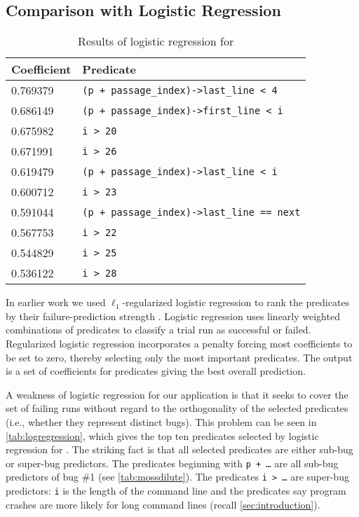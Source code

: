 \subsection{Comparison with Logistic Regression}
\label{sec:comparison}

\begin{table}
\nocaptionrule
\caption{Results of logistic regression for \moss}
\label{tab:logregression}
\centering
\small
\begin{tabular}{ll}
  \toprule
  Coefficient & Predicate \\
  \midrule
  0.769379 & \verb|(p + passage_index)->last_line < 4| \\
  0.686149 & \verb|(p + passage_index)->first_line < i| \\
  0.675982 & \verb|i > 20| \\
  0.671991 & \verb|i > 26| \\
  0.619479 & \verb|(p + passage_index)->last_line < i| \\
  0.600712 & \verb|i > 23| \\
  0.591044 & \verb|(p + passage_index)->last_line == next| \\
  0.567753 & \verb|i > 22| \\
  0.544829 & \verb|i > 25| \\
  0.536122 & \verb|i > 28| \\
  \bottomrule
\end{tabular}
\end{table}

In earlier work
we used $\ell_1$-regularized logistic regression
to rank the predicates by their
failure-prediction strength \cite{PLDI`03*141,NIPS2003_AP05}.
Logistic regression uses linearly weighted
combinations of predicates to classify a trial run as successful or
failed.  Regularized logistic regression incorporates a penalty
forcing most coefficients to be set to zero, thereby
selecting only the most important predicates.  The output is a set of
coefficients for predicates giving the best overall prediction.

A weakness of logistic regression for our application is that it seeks
to cover the set of failing runs without regard to the orthogonality
of the selected predicates (i.e., whether they represent distinct
bugs).  This problem can be seen in \autoref{tab:logregression},
which gives the top ten predicates selected by logistic regression
for \moss.  The striking fact is that all selected predicates are
either sub-bug or super-bug predictors.  The predicates beginning with
\texttt{p + \ldots} are all sub-bug predictors of bug \#1 (see
\autoref{tab:mossdilute}).  The predicates \texttt{i > \ldots} are
super-bug predictors: \texttt{i} is the length of the command line and
the predicates say program crashes are more likely for long command
lines (recall \autoref{sec:introduction}).

